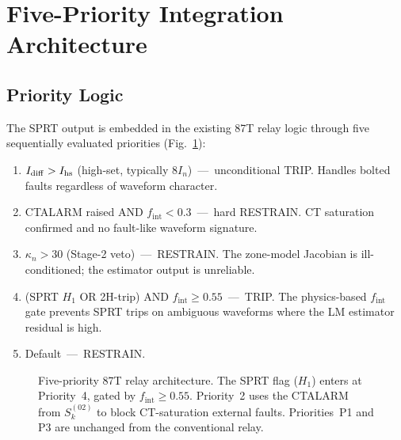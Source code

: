 \documentclass[journal,twoside,10pt]{IEEEtran}
\newcommand{\kn}{\kappa_n}
\newcommand{\fint}{f_{\mathrm{int}}}
\begin{document}
\section{Five-Priority Integration Architecture}
\label{sec:architecture}

\subsection{Priority Logic}
\label{sec:priorities}

The SPRT output is embedded in the existing 87T relay logic through five
sequentially evaluated priorities (Fig.~\ref{fig:arch}):

\begin{enumerate}
  \item[\textbf{P1.}] $I_{\rm diff} > I_{\rm hs}$ (high-set, typically
        $8I_n$)~---~unconditional TRIP. Handles bolted faults regardless
        of waveform character.

  \item[\textbf{P2.}] CTALARM raised AND $\fint < 0.3$~---~hard RESTRAIN.
        CT saturation confirmed and no fault-like waveform signature.

  \item[\textbf{P3.}] $\kn > 30$ (Stage-2 veto)~---~RESTRAIN. The
        zone-model Jacobian is ill-conditioned; the estimator output
        is unreliable.

  \item[\textbf{P4.}] (SPRT $H_1$ OR 2H-trip) AND $\fint \geq 0.55$~---~TRIP.
        The physics-based $\fint$ gate prevents SPRT trips on ambiguous
        waveforms where the LM estimator residual is high.

  \item[\textbf{P5.}] Default~---~RESTRAIN.
\end{enumerate}

\begin{figure}[!t]
  \centering
  
  \caption{Five-priority 87T relay architecture. The SPRT flag ($H_1$)
           enters at Priority~4, gated by $\fint \geq 0.55$. Priority~2
           uses the CTALARM from $S^{(02)}_k$ to block CT-saturation
           external faults. Priorities~P1 and P3 are unchanged from the
           conventional relay.}
  \label{fig:arch}
\end{figure}
\end{document}
